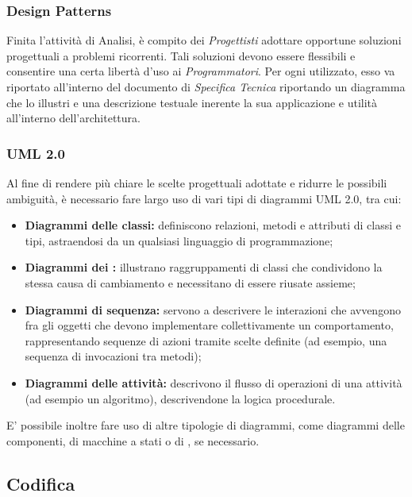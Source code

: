 \documentclass[../NomeDocumento.tex]{subfiles}
\begin{document}
	\subsubsection{Design Patterns}
	
	Finita l'attività di Analisi, è compito dei \textit{Progettisti} adottare opportune soluzioni progettuali a problemi ricorrenti. Tali soluzioni devono essere flessibili e consentire una certa libertà d'uso ai \textit{Programmatori}. Per ogni  utilizzato, esso va riportato all'interno del documento di \textit{Specifica Tecnica} riportando un diagramma che lo illustri e una descrizione testuale inerente la sua applicazione e utilità all'interno dell'architettura.
	
	\subsubsection{UML 2.0}
	
		Al fine di rendere più chiare le scelte progettuali adottate e ridurre le possibili ambiguità, è necessario fare largo uso di vari tipi di diagrammi UML 2.0, tra cui:
	
	\begin{itemize}
		\item \textbf{Diagrammi delle classi:} definiscono relazioni, metodi e attributi di classi e tipi, astraendosi da un qualsiasi linguaggio di programmazione;
		\item \textbf{Diagrammi dei :} illustrano raggruppamenti di classi che condividono la stessa causa di cambiamento e necessitano di essere riusate assieme;
		\item \textbf{Diagrammi di sequenza:} servono a descrivere le interazioni che avvengono fra gli oggetti che devono implementare collettivamente un comportamento, rappresentando sequenze di azioni tramite scelte definite (ad esempio, una sequenza di invocazioni tra metodi);
		\item \textbf{Diagrammi delle attività:} descrivono il flusso di operazioni di una attività (ad esempio un algoritmo), descrivendone la logica procedurale.
	\end{itemize}

	E' possibile inoltre fare uso di altre tipologie di diagrammi, come diagrammi delle componenti, di macchine a stati o di , se necessario.
	
	\subsection{Codifica}
	
\end{document}

